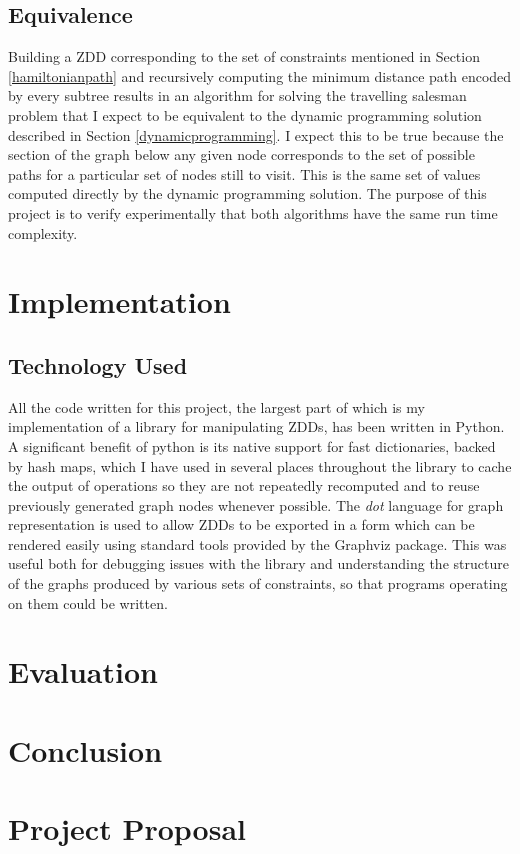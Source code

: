 \documentclass[12pt,a4paper,twoside,openright]{report}
\begin{document}
\section{Equivalence}
Building a ZDD corresponding to the set of constraints mentioned in Section \ref{hamiltonianpath} and recursively computing the minimum distance path encoded by every subtree results in an algorithm for solving the travelling salesman problem that I expect to be equivalent to the dynamic programming solution described in Section \ref{dynamicprogramming}. I expect this to be true because the section of the graph below any given node corresponds to the set of possible paths for a particular set of nodes still to visit. This is the same set of values computed directly by the dynamic programming solution. The purpose of this project is to verify experimentally that both algorithms have the same run time complexity.

\chapter{Implementation}

\section{Technology Used}
All the code written for this project, the largest part of which is my implementation of a library for manipulating ZDDs, has been written in Python. A significant benefit of python is its native support for fast dictionaries, backed by hash maps, which I have used in several places throughout the library to cache the output of operations so they are not repeatedly recomputed and to reuse previously generated graph nodes whenever possible.  The \textit{dot} language for graph representation is used to allow ZDDs to be exported in a form which can be rendered easily using standard tools provided by the Graphviz package. This was useful both for debugging issues with the library and understanding the structure of the graphs produced by various sets of constraints, so that programs operating on them could be written.

\chapter{Evaluation}

\chapter{Conclusion}



\appendix

\chapter{Project Proposal}


\end{document}
